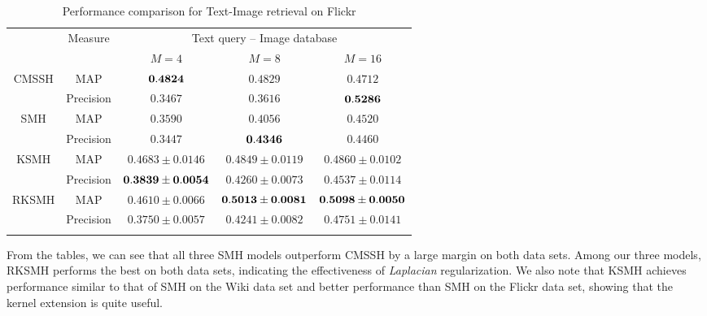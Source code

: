 \begin{table}[htb]\small
\caption{Performance comparison for Text-Image retrieval on \mbox{Flickr}}\label{table:comp-flickr-cross-ti}\vspace{-0.5cm}
\begin{center}
\begin{tabular}{|c|c|c|c|c|}
\toprule[1pt]\addlinespace[0pt]
    \multirow{2}{*}{Method}&  \multirow{2}{*}{Measure}  &  \multicolumn{3}{|c|}{Text query -- Image database}\\
\cline{3-5}%
&&$M=4$&$M=8$&$M=16$\\
\hline
\multirow{2}{*}{CMSSH}&{MAP}      &${\bf 0.4824}  $&$   {0.4829}  $& $    0.4712 $\\
\cline{2-5}%
&{Precision}    & $0.3467 $&$   0.3616   $&$  {\bf 0.5286 } $\\
\hline%
\multirow{2}{*}{SMH}&MAP &$0.3590  $&$   0.4056  $&$    0.4520 $\\
\cline{2-5}%
&{Precision}     &$0.3447   $&$ {\bf  0.4346 }  $&$   0.4460 $\\
\hline%
\multirow{2}{*}{KSMH}&MAP      & $0.4683   \pm0.0146$&$    0.4849  \pm     0.0119   $&$ 0.4860\pm   0.0102 $\\
\cline{2-5}%
&{Precision}   & $  {\bf 0.3839   \pm0.0054}  $&$   0.4260\pm    0.0073     $&$   0.4537\pm  0.0114 $\\
\hline%
\multirow{2}{*}{RKSMH}&MAP & $0.4610 \pm0.0066 $&$   {\bf 0.5013  \pm   0.0081}    $&$   {\bf 0.5098 \pm   0.0050}$\\
\cline{2-5}%
&{Precision}    &$0.3750   \pm0.0057   $&$  0.4241   \pm  0.0082    $&$  0.4751\pm  0.0141  $\\
\addlinespace[0pt]\bottomrule[1pt]
\end{tabular}
\end{center}
\end{table}

From the tables, we can see that all three \mbox{SMH} models outperform \mbox{CMSSH} by a large margin on both data sets. Among our three models, \mbox{RKSMH} performs the best on both data sets, indicating the effectiveness of \textit{Laplacian} regularization. We also note that  \mbox{KSMH} achieves performance similar to that of \mbox{SMH} on the \mbox{Wiki} data set and better performance than \mbox{SMH} on the \mbox{Flickr} data set, showing that the kernel extension is quite useful.

